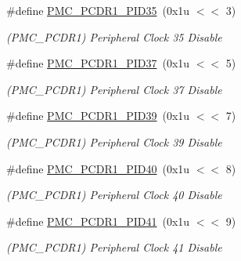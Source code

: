 \begin{DoxyCompactItemize}
\mbox{\label{group__SAMS70__PMC_gab1fd1c1d986befa79913baf342cd3e72}} 
\#define \mbox{\hyperlink{group__SAMS70__PMC_gab1fd1c1d986befa79913baf342cd3e72}{P\+M\+C\+\_\+\+P\+C\+D\+R1\+\_\+\+P\+I\+D35}}~(0x1u $<$$<$ 3)
\begin{DoxyCompactList}\small\item\em (P\+M\+C\+\_\+\+P\+C\+D\+R1) Peripheral Clock 35 Disable \end{DoxyCompactList}\item 
\mbox{\label{group__SAMS70__PMC_ga710106c0e561196af743f9c85af4b78e}} 
\#define \mbox{\hyperlink{group__SAMS70__PMC_ga710106c0e561196af743f9c85af4b78e}{P\+M\+C\+\_\+\+P\+C\+D\+R1\+\_\+\+P\+I\+D37}}~(0x1u $<$$<$ 5)
\begin{DoxyCompactList}\small\item\em (P\+M\+C\+\_\+\+P\+C\+D\+R1) Peripheral Clock 37 Disable \end{DoxyCompactList}\item 
\mbox{\label{group__SAMS70__PMC_gaa857e9321c2268a3cef83b1bb0db20d7}} 
\#define \mbox{\hyperlink{group__SAMS70__PMC_gaa857e9321c2268a3cef83b1bb0db20d7}{P\+M\+C\+\_\+\+P\+C\+D\+R1\+\_\+\+P\+I\+D39}}~(0x1u $<$$<$ 7)
\begin{DoxyCompactList}\small\item\em (P\+M\+C\+\_\+\+P\+C\+D\+R1) Peripheral Clock 39 Disable \end{DoxyCompactList}\item 
\mbox{\label{group__SAMS70__PMC_gadab304c1c9edb8155d57794c47cbd685}} 
\#define \mbox{\hyperlink{group__SAMS70__PMC_gadab304c1c9edb8155d57794c47cbd685}{P\+M\+C\+\_\+\+P\+C\+D\+R1\+\_\+\+P\+I\+D40}}~(0x1u $<$$<$ 8)
\begin{DoxyCompactList}\small\item\em (P\+M\+C\+\_\+\+P\+C\+D\+R1) Peripheral Clock 40 Disable \end{DoxyCompactList}\item 
\mbox{\label{group__SAMS70__PMC_ga52fe068b9d6fd474e5f1707b56c7883a}} 
\#define \mbox{\hyperlink{group__SAMS70__PMC_ga52fe068b9d6fd474e5f1707b56c7883a}{P\+M\+C\+\_\+\+P\+C\+D\+R1\+\_\+\+P\+I\+D41}}~(0x1u $<$$<$ 9)
\begin{DoxyCompactList}\small\item\em (P\+M\+C\+\_\+\+P\+C\+D\+R1) Peripheral Clock 41 Disable \end{DoxyCompactList}\item 
$$
\end{DoxyCompactItemize}
